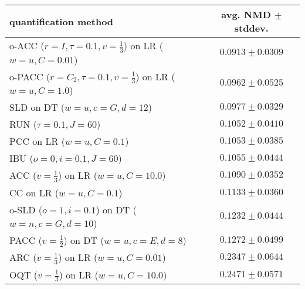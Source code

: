 \begin{tabular}{lc}
  \toprule
  quantification method & avg. NMD $\pm$ stddev. \\
  \midrule
  o-ACC ($r=I, \tau=0.1, v=\frac{1}{3}$) on LR ($w=u, C=0.01$) & $\mathbf{0.0913 \pm 0.0309}$ \\
  o-PACC ($r=C_2, \tau=0.1, v=\frac{1}{3}$) on LR ($w=u, C=1.0$) & $\mathbf{0.0962 \pm 0.0525}$ \\
  SLD on DT ($w=u, c=G, d=12$) & $0.0977 \pm 0.0329$ \\
  RUN ($\tau=0.1, J=60$) & $0.1052 \pm 0.0410$ \\
  PCC on LR ($w=u, C=0.1$) & $0.1053 \pm 0.0385$ \\
  IBU ($o=0, i=0.1, J=60$) & $0.1055 \pm 0.0444$ \\
  ACC ($v=\frac{1}{3}$) on LR ($w=u, C=10.0$) & $0.1090 \pm 0.0352$ \\
  CC on LR ($w=u, C=0.1$) & $0.1133 \pm 0.0360$ \\
  o-SLD ($o=1, i=0.1$) on DT ($w=n, c=G, d=10$) & $0.1232 \pm 0.0444$ \\
  PACC ($v=\frac{1}{2}$) on DT ($w=u, c=E, d=8$) & $0.1272 \pm 0.0499$ \\
  ARC ($v=\frac{1}{3}$) on LR ($w=u, C=0.01$) & $0.2347 \pm 0.0644$ \\
  OQT ($v=\frac{1}{3}$) on LR ($w=u, C=10.0$) & $0.2471 \pm 0.0571$ \\
  \bottomrule
\end{tabular}
